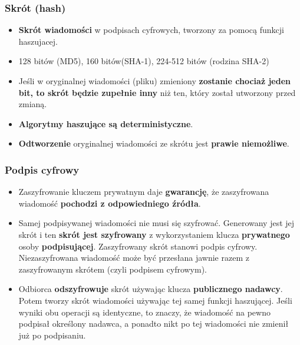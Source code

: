 \documentclass[../main.tex]{subfiles}
\begin{document}
    \subsubsection{Skrót (hash)}
    \begin{itemize}
        \item \textbf{Skrót wiadomości} w podpisach cyfrowych, tworzony za pomocą funkcji haszujacej.
        \item 128 bitów (MD5), 160 bitów(SHA-1), 224-512 bitów (rodzina SHA-2)
        \item Jeśli w oryginalnej wiadomości (pliku)
        zmieniony \textbf{zostanie chociaż jeden bit, to skrót będzie zupełnie inny} niż ten, który został
        utworzony przed zmianą.
        \item \textbf{Algorytmy haszujące są deterministyczne}.
        \item \textbf{Odtworzenie} oryginalnej wiadomości ze skrótu jest \textbf{prawie niemożliwe}.
    \end{itemize}


    \subsubsection{Podpis cyfrowy}
    \begin{itemize}
        \item Zaszyfrowanie kluczem prywatnym daje \textbf{gwarancję}, że zaszyfrowana wiadomość \textbf{pochodzi z
        odpowiedniego źródła}.
        \item Samej podpisywanej wiadomości nie musi się szyfrować. Generowany jest jej skrót
        i ten \textbf{skrót jest szyfrowany} z wykorzystaniem klucza
        \textbf{prywatnego} osoby \textbf{podpisującej}. Zaszyfrowany skrót stanowi podpis cyfrowy.
        Niezaszyfrowana wiadomość może być przesłana jawnie razem z zaszyfrowanym skrótem
        (czyli podpisem cyfrowym).
        \item Odbiorca \textbf{odszyfrowuje} skrót używając klucza
        \textbf{publicznego nadawcy}. Potem tworzy skrót wiadomości używając tej samej funkcji haszującej. Jeśli wyniki
        obu operacji są identyczne, to znaczy, że wiadomość na pewno
        podpisał określony nadawca, a ponadto nikt po tej wiadomości nie zmienił już po podpisaniu.
    \end{itemize}
\end{document}
